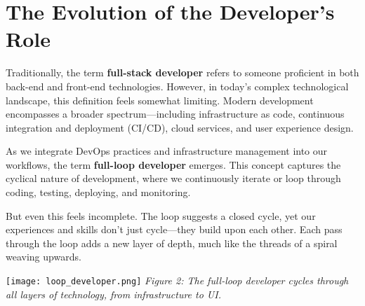 \documentclass[../../main.tex]{subfiles}
\begin{document}
    \section{The Evolution of the Developer's Role}

        Traditionally, the term \textbf{full-stack developer} refers to someone proficient in both back-end and front-end technologies. However, in today's complex technological landscape, this definition feels somewhat limiting. Modern development encompasses a broader spectrum—including infrastructure as code, continuous integration and deployment (CI/CD), cloud services, and user experience design.

        As we integrate DevOps practices and infrastructure management into our workflows, the term \textbf{full-loop developer} emerges. This concept captures the cyclical nature of development, where we continuously iterate or loop through coding, testing, deploying, and monitoring.

        But even this feels incomplete. The loop suggests a closed cycle, yet our experiences and skills don't just cycle—they build upon each other. Each pass through the loop adds a new layer of depth, much like the threads of a spiral weaving upwards.

        \vspace{0.5cm}
        \noindent\texttt{[image: loop\_developer.png]}
        \newline
        \textit{Figure 2: The full-loop developer cycles through all layers of technology, from infrastructure to UI.}
        \vspace{0.5cm}
\end{document}
